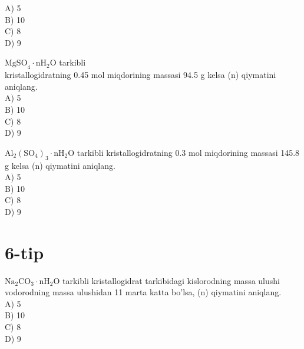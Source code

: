 A) 5\\
B) 10\\
C) 8\\
D) 9
  \item $\mathrm{MgSO}_{4} \cdot \mathrm{nH}_{2} \mathrm{O}$ tarkibli\\
kristallogidratning 0.45 mol miqdorining massasi 94.5 g kelsa (n) qiymatini aniqlang.\\
A) 5\\
B) 10\\
C) 8\\
D) 9
  \item $\mathrm{Al}_{2}\left(\mathrm{SO}_{4}\right)_{3} \cdot \mathrm{nH}_{2} \mathrm{O}$ tarkibli kristallogidratning 0.3 mol miqdorining massasi 145.8 g kelsa (n) qiymatini aniqlang.\\
A) 5\\
B) 10\\
C) 8\\
D) 9


\section*{6-tip}

  \setcounter{enumi}{50}
  \item $\mathrm{Na}_{2} \mathrm{CO}_{3} \cdot \mathrm{nH}_{2} \mathrm{O}$ tarkibli kristallogidrat tarkibidagi kislorodning massa ulushi vodorodning massa ulushidan 11 marta katta bo'lsa, (n) qiymatini aniqlang.\\
A) 5\\
B) 10\\
C) 8\\
D) 9\\

